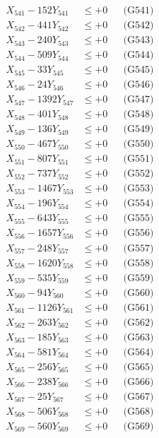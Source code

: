 \documentclass[a4paper,10pt]{article}
\begin{document}
{\begin{align}
\allowbreak
X_{541} - 152Y_{541} &\leq +0 && \text{(G541)} \\
X_{542} - 441Y_{542} &\leq +0 && \text{(G542)} \\
X_{543} - 240Y_{543} &\leq +0 && \text{(G543)} \\
X_{544} - 509Y_{544} &\leq +0 && \text{(G544)} \\
X_{545} - 33Y_{545} &\leq +0 && \text{(G545)} \\
X_{546} - 24Y_{546} &\leq +0 && \text{(G546)} \\
X_{547} - 1392Y_{547} &\leq +0 && \text{(G547)} \\
X_{548} - 401Y_{548} &\leq +0 && \text{(G548)} \\
X_{549} - 136Y_{549} &\leq +0 && \text{(G549)} \\
X_{550} - 467Y_{550} &\leq +0 && \text{(G550)} \\
\allowbreak
X_{551} - 807Y_{551} &\leq +0 && \text{(G551)} \\
X_{552} - 737Y_{552} &\leq +0 && \text{(G552)} \\
X_{553} - 1467Y_{553} &\leq +0 && \text{(G553)} \\
X_{554} - 196Y_{554} &\leq +0 && \text{(G554)} \\
X_{555} - 643Y_{555} &\leq +0 && \text{(G555)} \\
X_{556} - 1657Y_{556} &\leq +0 && \text{(G556)} \\
X_{557} - 248Y_{557} &\leq +0 && \text{(G557)} \\
X_{558} - 1620Y_{558} &\leq +0 && \text{(G558)} \\
X_{559} - 535Y_{559} &\leq +0 && \text{(G559)} \\
X_{560} - 94Y_{560} &\leq +0 && \text{(G560)} \\
\allowbreak
X_{561} - 1126Y_{561} &\leq +0 && \text{(G561)} \\
X_{562} - 263Y_{562} &\leq +0 && \text{(G562)} \\
X_{563} - 185Y_{563} &\leq +0 && \text{(G563)} \\
X_{564} - 581Y_{564} &\leq +0 && \text{(G564)} \\
X_{565} - 256Y_{565} &\leq +0 && \text{(G565)} \\
X_{566} - 238Y_{566} &\leq +0 && \text{(G566)} \\
X_{567} - 25Y_{567} &\leq +0 && \text{(G567)} \\
X_{568} - 506Y_{568} &\leq +0 && \text{(G568)} \\
X_{569} - 560Y_{569} &\leq +0 && \text{(G569)} \\

\end{align}}
\end{document}
